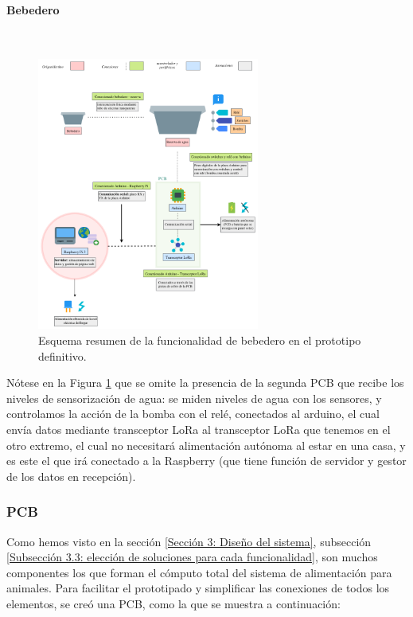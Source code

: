 \documentclass[12pt]{article}
\newcommand{\subsubsubsection}[1]{\paragraph{#1}\mbox{}\\}
\begin{document}
	\pagebreak
	
	\subsubsubsection{Bebedero}
	\begin{figure}[h!]
		\begin{center}
			\includegraphics[width=0.65\textwidth]{img/conexiones tfg-bebedero.png}
			\caption{Esquema resumen de la funcionalidad de bebedero en el prototipo definitivo.}
			\label{Conexiones TFG bebedero.}
		\end{center}
	\end{figure}
	
	\noindent Nótese en la Figura \ref{Conexiones TFG bebedero.} que se omite la presencia de la segunda PCB que recibe los niveles de sensorización de agua: se miden niveles de agua con los sensores, y controlamos la acción de la bomba con el relé, conectados al arduino, el cual envía datos mediante transceptor LoRa al transceptor LoRa que tenemos en el otro extremo, el cual no necesitará alimentación autónoma al estar en una casa, y es este el que irá conectado a la Raspberry (que tiene función de servidor y gestor de los datos en recepción). \\
	
	\pagebreak
	
	\subsubsection{PCB}
	
	\noindent Como hemos visto en la sección \ref{Sección 3: Diseño del sistema}, subsección \ref{Subsección 3.3: elección de soluciones para cada funcionalidad}, son muchos componentes los que forman el cómputo total del sistema de alimentación para animales. Para facilitar el prototipado y simplificar las conexiones de todos los elementos, se creó una PCB, como la que se muestra a continuación: \\
	
\end{document}
